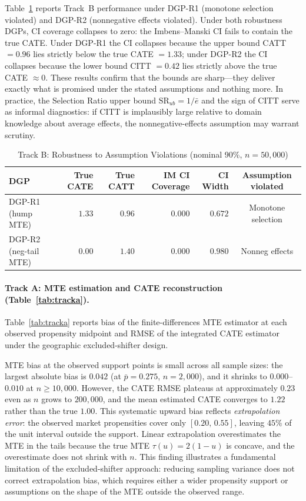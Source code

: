 \documentclass[11pt]{article}
\begin{document}
Table~\ref{tab:robust} reports Track~B performance under DGP-R1 (monotone
selection violated) and DGP-R2 (nonnegative effects violated).  Under both
robustness DGPs, CI coverage collapses to zero: the Imbens--Manski CI fails
to contain the true CATE.  Under DGP-R1 the CI collapses because the upper
bound CATT $= 0.96$ lies strictly below the true CATE $= 1.33$; under DGP-R2
the CI collapses because the lower bound CITT $= 0.42$ lies strictly above the
true CATE $\approx 0$.  These results confirm that the bounds are sharp---they
deliver exactly what is promised under the stated assumptions and nothing more.
In practice, the Selection Ratio upper bound $\mathrm{SR}_{ub} = 1/\bar{e}$
and the sign of $\mathrm{CITT}$ serve as informal diagnostics: if CITT is
implausibly large relative to domain knowledge about average effects, the
nonnegative-effects assumption may warrant scrutiny.

\begin{table}[htbp]
  \centering
  \small
  \caption{Track B: Robustness to Assumption Violations (nominal 90\%, $n = 50{,}000$)}
  \label{tab:robust}
  \begin{tabular}{lrrrrc}
    \toprule
    DGP & True CATE & True CATT & IM CI Coverage & CI Width & Assumption violated \\
    \midrule
    DGP-R1 (hump MTE)      & $1.33$ & $0.96$ & $0.000$ & $0.672$ & Monotone selection \\
    DGP-R2 (neg-tail MTE)  & $0.00$ & $1.40$ & $0.000$ & $0.980$ & Nonneg effects \\
    \bottomrule
  \end{tabular}
\end{table}

\paragraph{Track A: MTE estimation and CATE reconstruction (Table~\ref{tab:tracka}).}

Table~\ref{tab:tracka} reports bias of the finite-differences MTE estimator at
each observed propensity midpoint and RMSE of the integrated CATE estimator
under the geographic excluded-shifter design.

MTE bias at the observed support points is small across all sample sizes: the
largest absolute bias is $0.042$ (at $\bar{p} = 0.275$, $n = 2{,}000$), and
it shrinks to $0.000$--$0.010$ at $n \geq 10{,}000$.  However, the CATE RMSE
plateaus at approximately $0.23$ even as $n$ grows to $200{,}000$, and the
mean estimated CATE converges to $1.22$ rather than the true $1.00$.  This
systematic upward bias reflects \emph{extrapolation error}: the observed market
propensities cover only $[0.20,\,0.55]$, leaving $45\%$ of the unit interval
outside the support.  Linear extrapolation overestimates the MTE in the tails
because the true MTE $\tau(u) = 2(1-u)$ is concave, and the overestimate does
not shrink with $n$.  This finding illustrates a fundamental limitation of the
excluded-shifter approach: reducing sampling variance does not correct
extrapolation bias, which requires either a wider propensity support or
assumptions on the shape of the MTE outside the observed range.
\end{document}
